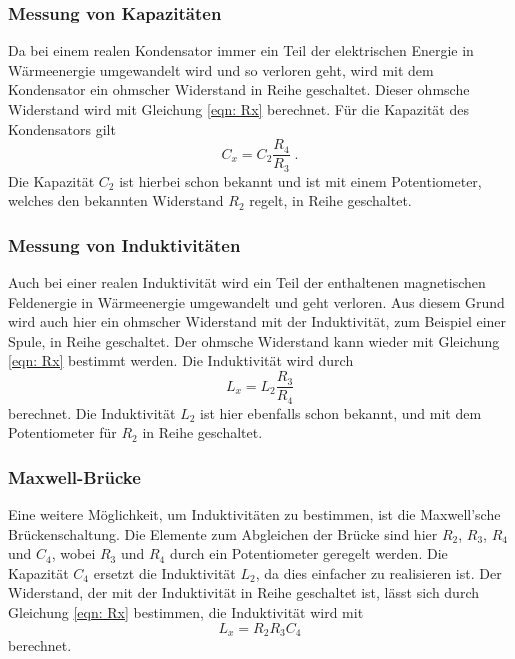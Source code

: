     \subsubsection{Messung von Kapazitäten}

        Da bei einem realen Kondensator immer ein Teil der elektrischen Energie in Wärmeenergie umgewandelt
        wird und so verloren geht, wird mit dem Kondensator ein ohmscher Widerstand in Reihe geschaltet.
        Dieser ohmsche Widerstand wird mit Gleichung \eqref{eqn: Rx} berechnet.
        Für die Kapazität des Kondensators gilt
        \begin{equation}
            C_x = C_2 \frac{R_4}{R_3} \; .
        \end{equation}
        Die Kapazität $C_2$ ist hierbei schon bekannt und ist mit einem Potentiometer, welches den bekannten Widerstand $R_2$ regelt,
        in Reihe geschaltet.

    \subsubsection{Messung von Induktivitäten}

        Auch bei einer realen Induktivität wird ein Teil der enthaltenen magnetischen Feldenergie in Wärmeenergie umgewandelt
        und geht verloren. Aus diesem Grund wird auch hier ein ohmscher Widerstand mit der Induktivität, zum Beispiel einer Spule,
        in Reihe geschaltet.
        Der ohmsche Widerstand kann wieder mit Gleichung \eqref{eqn: Rx} bestimmt werden.
        Die Induktivität wird durch
        \begin{equation}
            L_x = L_2 \frac{R_3}{R_4}
        \end{equation}
        berechnet.
        Die Induktivität $L_2$ ist hier ebenfalls schon bekannt, und mit dem Potentiometer für $R_2$ in Reihe geschaltet.

    \subsubsection{Maxwell-Brücke}

        Eine weitere Möglichkeit, um Induktivitäten zu bestimmen, ist die Maxwell'sche Brückenschaltung.
        Die Elemente zum Abgleichen der Brücke sind hier $R_2$, $R_3$, $R_4$ und $C_4$, wobei $R_3$ und $R_4$ durch ein
        Potentiometer geregelt werden. Die Kapazität $C_4$ ersetzt die Induktivität $L_2$, da dies
        einfacher zu realisieren ist.
        Der Widerstand, der mit der Induktivität in Reihe geschaltet ist, lässt sich durch Gleichung \eqref{eqn: Rx} bestimmen,
        die Induktivität wird mit
        \begin{equation}
            L_x = R_2 R_3 C_4
        \end{equation}
        berechnet.


